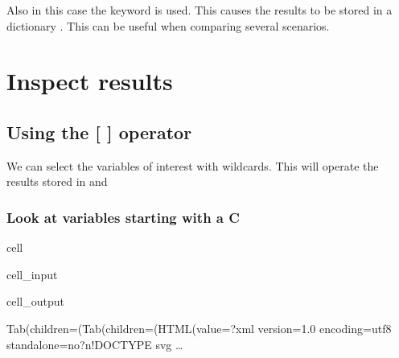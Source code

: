 \documentclass[letterpaper,10pt,english]{jupyterBook}
\begin{document}
\sphinxAtStartPar
Also in this case the keyword  is used. This causes the results to be  stored in a dictionary . This can be useful when comparing several scenarios.


\section{Inspect results}
\label{\detokenize{content/notebooks/intro/Example Solow:inspect-results}}

\subsection{Using the {[} {]} operator}
\label{\detokenize{content/notebooks/intro/Example Solow:using-the-operator}}
\sphinxAtStartPar
We can select the variables of interest with wildcards. This will operate the results stored in  and 


\subsubsection{Look at variables starting with a C}
\label{\detokenize{content/notebooks/intro/Example Solow:look-at-variables-starting-with-a-c}}
\begin{sphinxuseclass}{cell}\begin{sphinxVerbatimInput}

\begin{sphinxuseclass}{cell_input}
\begin{sphinxVerbatim}[commandchars=\\\{\}]
\PYG{p}{[}\PYG{p}{]}
\end{sphinxVerbatim}

\end{sphinxuseclass}\end{sphinxVerbatimInput}
\begin{sphinxVerbatimOutput}

\begin{sphinxuseclass}{cell_output}
\begin{sphinxVerbatim}[commandchars=\\\{\}]
Tab(children=(Tab(children=(HTML(value=\PYGZsq{}\PYGZlt{}?xml version=\PYGZdq{}1.0\PYGZdq{} encoding=\PYGZdq{}utf\PYGZhy{}8\PYGZdq{} standalone=\PYGZdq{}no\PYGZdq{}?\PYGZgt{}\PYGZbs{}n\PYGZlt{}!DOCTYPE svg …
\end{sphinxVerbatim}

\begin{sphinxVerbatim}[commandchars=\\\{\}]

\end{sphinxVerbatim}

\end{sphinxuseclass}\end{sphinxVerbatimOutput}

\end{sphinxuseclass}
\end{document}
